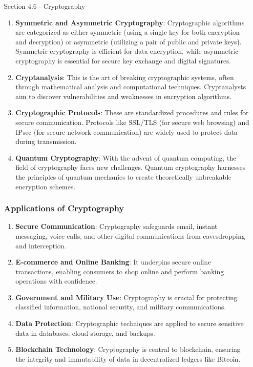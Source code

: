 \begin{notes}{Section 4.6 - Cryptography}
    \begin{enumerate}
        \item \textbf{Symmetric and Asymmetric Cryptography}: Cryptographic algorithms are categorized as either symmetric (using a single key for both encryption and decryption) or asymmetric 
        (utilizing a pair of public and private keys). Symmetric cryptography is efficient for data encryption, while asymmetric cryptography is essential for secure key exchange and digital signatures.
        \item \textbf{Cryptanalysis}: This is the art of breaking cryptographic systems, often through mathematical analysis and computational techniques. Cryptanalysts aim to discover vulnerabilities 
        and weaknesses in encryption algorithms.
        \item \textbf{Cryptographic Protocols}: These are standardized procedures and rules for secure communication. Protocols like SSL/TLS (for secure web browsing) and IPsec (for secure network 
        communication) are widely used to protect data during transmission.
        \item \textbf{Quantum Cryptography}: With the advent of quantum computing, the field of cryptography faces new challenges. Quantum cryptography harnesses the principles of quantum mechanics 
        to create theoretically unbreakable encryption schemes.
    \end{enumerate}
    
    \subsubsection*{Applications of Cryptography}

    \begin{enumerate}
        \item \textbf{Secure Communication}: Cryptography safeguards email, instant messaging, voice calls, and other digital communications from eavesdropping and interception.
        \item \textbf{E-commerce and Online Banking}: It underpins secure online transactions, enabling consumers to shop online and perform banking operations with confidence.
        \item \textbf{Government and Military Use}: Cryptography is crucial for protecting classified information, national security, and military communications.
        \item \textbf{Data Protection}: Cryptographic techniques are applied to secure sensitive data in databases, cloud storage, and backups.
        \item \textbf{Blockchain Technology}: Cryptography is central to blockchain, ensuring the integrity and immutability of data in decentralized ledgers like Bitcoin.
    \end{enumerate}
    

\end{notes}
